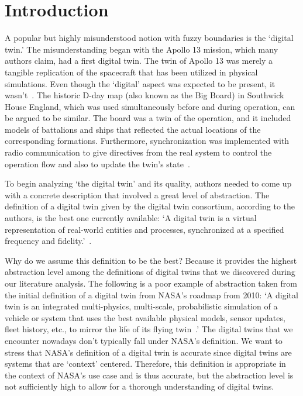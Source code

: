\documentclass[9pt,conference]{IEEEtran}
\begin{document}
    \section{Introduction}\label{section:introduction}
    A popular but highly misunderstood notion with fuzzy boundaries is the `digital twin.' 
    The misunderstanding began with the Apollo 13 mission, which many authors claim, had a first digital twin. The twin of Apollo 13 was merely a tangible replication of the spacecraft that has been utilized in physical simulations. Even though the `digital' aspect was expected to be present, 
    it wasn't~\cite{GrievesApollo13}. The historic D-day map (also known as the Big Board) in Southwick House England, which was used simultaneously before and during operation, can be argued to be similar. 
    The board was a twin of the operation, and it included models of battalions and ships that reflected the actual locations of the corresponding formations. 
    Furthermore, synchronization was implemented with radio communication to give directives from the real system to control the operation flow and also to update the twin's state~\cite{AMRC}.

    To begin analyzing `the digital twin' and its quality, authors needed to come up with a concrete description that involved a great level of abstraction. 
    The definition of a digital twin given by the digital twin consortium, according to the authors, is the best one currently available: `A digital twin is a virtual representation of real-world entities and processes, synchronized at 
    a specified frequency and fidelity.'~\cite{digitaltwinconsortium2022}.

    Why do we assume this definition to be the best? Because it provides the highest abstraction level among the definitions of digital twins that we discovered during our literature analysis. The following is a poor example of abstraction taken from the initial definition of a digital twin from NASA's roadmap from 2010: `A digital twin is an integrated multi-physics, multi-scale, probabilistic simulation of a 
    vehicle or system that uses the best available physical models, sensor updates, fleet history, etc., to mirror the life of its flying twin~\cite{NASA}.'
    The digital twins that we encounter nowadays don't typically fall under NASA's definition. We want to stress that NASA's definition of a  digital twin is accurate since digital twins are systems that are `context' centered. 
    Therefore, this definition is appropriate in the context of NASA's use case and is thus accurate, but the abstraction level is not sufficiently high to allow for a thorough understanding of digital twins.
\end{document}
